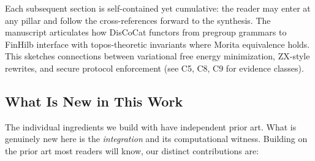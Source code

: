 \documentclass[
]{article}
\begin{document}
Each subsequent section is self-contained yet cumulative: the reader may
enter at any pillar and follow the cross-references forward to the
synthesis. The manuscript articulates how DisCoCat functors from
pregroup grammars to FinHilb interface with topos-theoretic invariants
where Morita equivalence holds. This sketches connections between
variational free energy minimization, ZX-style rewrites, and secure
protocol enforcement (see C5, C8, C9 for evidence classes).

\subsection{What Is New in This Work}\label{sec:whats-new}

The individual ingredients we build with have independent prior art.
What is genuinely new here is the \emph{integration} and its
computational witness. Building on the prior art most readers will know,
our distinct contributions are:
\end{document}
